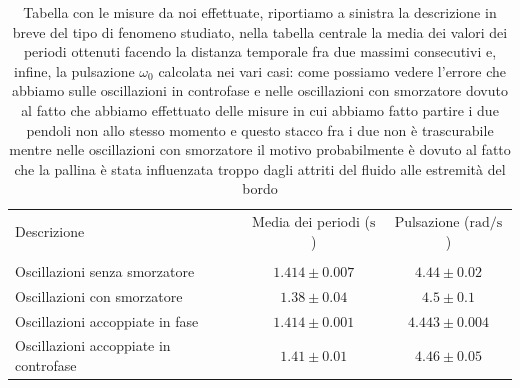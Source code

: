 \documentclass{article}
\begin{document}
\begin{table}
\centering
\begin{tabular}{l c c} \toprule
Descrizione & Media dei periodi ($\si{\second}$) & Pulsazione ($\si{\radian\per\second}$) \\ \\ \toprule
Oscillazioni senza smorzatore & $1.414 \pm 0.007$ & $4.44 \pm 0.02$ \\ \midrule
Oscillazioni con smorzatore & $1.38 \pm 0.04$ & $4.5 \pm 0.1$ \\ \midrule
Oscillazioni accoppiate in fase & $1.414 \pm 0.001$ & $4.443 \pm 0.004$ \\ \midrule
Oscillazioni accoppiate in controfase & $1.41 \pm 0.01$ & $4.46 \pm 0.05$ \\ \bottomrule
\end{tabular}
\label{tab:misurazioni}
\caption{Tabella con le misure da noi effettuate, riportiamo a sinistra la descrizione in breve del tipo di fenomeno studiato, nella tabella centrale la media dei valori dei periodi ottenuti facendo la distanza temporale fra due massimi consecutivi e, infine, la pulsazione $\omega_0$ calcolata nei vari casi: come possiamo vedere l'errore che abbiamo sulle oscillazioni in controfase e nelle oscillazioni con smorzatore dovuto al fatto che abbiamo effettuato delle misure in cui abbiamo fatto partire i due pendoli non allo stesso momento e questo stacco fra i due non è trascurabile mentre nelle oscillazioni con smorzatore il motivo probabilmente è dovuto al fatto che la pallina è stata influenzata troppo dagli attriti del fluido alle estremità del bordo}
\end{table}
\end{document}

